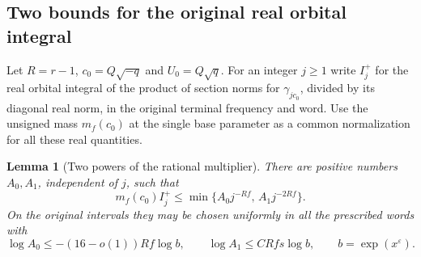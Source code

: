 \documentclass[a4paper,11pt]{article}
\newtheorem{lemma}[proposition]{Lemma}
\theoremstyle{definition}
\theoremstyle{remark}
\numberwithin{equation}{section}
\begin{document}
\subsection{Two bounds for the original real orbital integral}\label{nav:I-67}
Let \(R=r-1\), \(c_0=Q\sqrt{-q}\) and \(U_0=Q\sqrt q\).
For an integer \(j\ge1\) write \(I_j^+\) for the real
orbital integral of the product of section norms for
\(\gamma_{j c_0}\), divided by its diagonal real norm,
in the original terminal frequency and word. Use the
unsigned mass \(m_f(c_0)\) at the single base parameter
as a common normalization for all these real quantities.

\begin{lemma}[Two powers of the rational multiplier]\leavevmode
\label{lem:real287}
There are positive numbers \(A_0,A_1\), independent of
\(j\), such that
\[
 m_f(c_0) I_j^+
    \le \min\{A_0 j^{-Rf},\,A_1 j^{-2Rf}\}.
\]
On the original intervals they may be chosen uniformly
in all the prescribed words with
\[
 \log A_0\le -(16-o(1))Rf\log b,\qquad
 \log A_1\le C R f s\log b,\qquad b=\exp(x^\varepsilon).
\]
\end{lemma}
\end{document}
